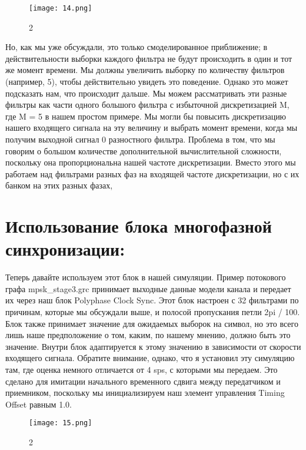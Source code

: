 \documentclass[10pt,a4paper,oneside]{article}
\begin{document}
\begin{figure}[H]
        \centering
        \texttt{[image: 14.png]}
        \caption{2}
        \label{fig:first}
\end{figure}

Но, как мы уже обсуждали, это только смоделированное приближение; в действительности выборки каждого фильтра не будут происходить в один и тот же момент времени. Мы должны увеличить выборку по количеству фильтров (например, 5), чтобы действительно увидеть это поведение. Однако это может подсказать нам, что происходит дальше. Мы можем рассматривать эти разные фильтры как части одного большого фильтра с избыточной дискретизацией M, где M = 5 в нашем простом примере. Мы могли бы повысить дискретизацию нашего входящего сигнала на эту величину и выбрать момент времени, когда мы получим выходной сигнал 0 разностного фильтра. Проблема в том, что мы говорим о большом количестве дополнительной вычислительной сложности, поскольку она пропорциональна нашей частоте дискретизации. Вместо этого мы работаем над фильтрами разных фаз на входящей частоте дискретизации, но с их банком на этих разных фазах,

\section{Использование блока многофазной синхронизации:}

Теперь давайте используем этот блок в нашей симуляции. Пример потокового графа mpsk_stage3.grc принимает выходные данные модели канала и передает их через наш блок Polyphase Clock Sync. Этот блок настроен с 32 фильтрами по причинам, которые мы обсуждали выше, и полосой пропускания петли 2pi / 100. Блок также принимает значение для ожидаемых выборок на символ, но это всего лишь наше предположение о том, каким, по нашему мнению, должно быть это значение. Внутри блок адаптируется к этому значению в зависимости от скорости входящего сигнала. Обратите внимание, однако, что я установил эту симуляцию там, где оценка немного отличается от 4 sps, с которыми мы передаем. Это сделано для имитации начального временного сдвига между передатчиком и приемником, поскольку мы инициализируем наш элемент управления Timing Offset равным 1.0.

\begin{figure}[H]
        \centering
        \texttt{[image: 15.png]}
        \caption{2}
        \label{fig:first}
\end{figure}
\end{document}

